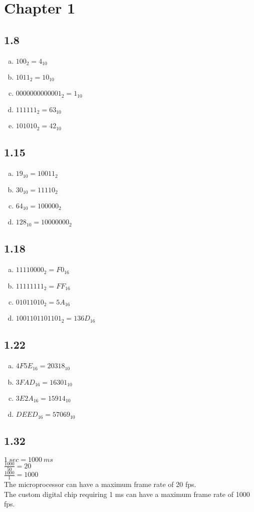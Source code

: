 \clearpage
\section*{Chapter 1}
\subsection*{1.8}
\begin{enumerate}[(a)]
    \item $100_2=4_{10}$
    \item $1011_2=10_{10}$
    \item $0000000000001_2=1_{10}$
    \item $111111_2=63_{10}$
    \item $101010_2=42_{10}$
\end{enumerate}

\subsection*{1.15}
\begin{enumerate}[(a)]
    \item $19_{10}=10011_2$
    \item $30_{10}=11110_2$
    \item $64_{10}=100000_2$
    \item $128_{10}=10000000_{2}$
\end{enumerate}

\subsection*{1.18}
\begin{enumerate}[(a)]
    \item $11110000_{2}=F0_{16}$
    \item $11111111_{2}=FF_{16}$
    \item $01011010_{2}=5A_{16}$
    \item $1001101101101_{2}=136D_{16}$
\end{enumerate}

\subsection*{1.22}
\begin{enumerate}[(a)]
    \item $4F5E_{16}=20318_{10}$
    \item $3FAD_{16}=16301_{10}$
    \item $3E2A_{16}=15914_{10}$
    \item $DEED_{16}=57069_{10}$
\end{enumerate}

\subsection*{1.32}
$1\ sec=1000\ ms$\\
$\displaystyle\frac{1000}{50}=20$\\
$\displaystyle\frac{1000}{1}=1000$\\
The microprocessor can have a maximum frame rate of 20 fps.\\
The custom digital chip requiring 1 ms can have a maximum frame rate of 1000 fps.